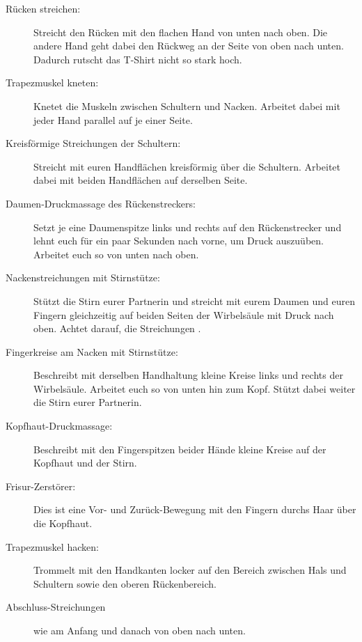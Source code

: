 \begin{description}
  \item [Rücken streichen:] Streicht den Rücken mit den flachen Hand von unten nach oben. Die andere Hand geht dabei den Rückweg an der Seite von oben nach unten. Dadurch rutscht das T-Shirt nicht so stark hoch.
  \item [Trapezmuskel kneten:] Knetet die Muskeln zwischen Schultern und Nacken. Arbeitet dabei mit jeder Hand parallel auf je einer Seite.
  \item [Kreisförmige Streichungen der Schultern:] Streicht mit euren Handflächen kreisförmig über die Schultern. Arbeitet dabei mit beiden Handflächen auf derselben Seite.
  \item [Daumen-Druckmassage des Rückenstreckers:] Setzt je eine Daumenspitze links und rechts auf den Rückenstrecker und lehnt euch für ein paar Sekunden nach vorne, um Druck auszuüben. Arbeitet euch so von unten nach oben.
  \item [Nackenstreichungen mit Stirnstütze:] Stützt die Stirn eurer Partnerin und streicht mit eurem Daumen und euren Fingern gleichzeitig auf beiden Seiten der Wirbelsäule mit Druck nach oben. Achtet darauf, die Streichungen .
  \item [Fingerkreise am Nacken mit Stirnstütze:] Beschreibt mit derselben Handhaltung kleine Kreise links und rechts der Wirbelsäule. Arbeitet euch so von unten hin zum Kopf. Stützt dabei weiter die Stirn eurer Partnerin.
  \item [Kopfhaut-Druckmassage:] Beschreibt mit den Fingerspitzen beider Hände kleine Kreise auf der Kopfhaut und der Stirn.
  \item [Frisur-Zerstörer:] Dies ist eine Vor- und Zurück-Bewegung mit den Fingern durchs Haar über die Kopfhaut.
  \item [Trapezmuskel hacken:] Trommelt mit den Handkanten locker auf den Bereich zwischen Hals und Schultern sowie den oberen Rückenbereich.
  \item [Abschluss-Streichungen] wie am Anfang und danach von oben nach unten.
\end{description}
